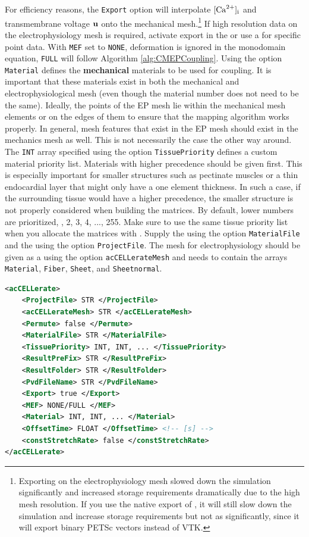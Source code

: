 For efficiency reasons, the \verb|Export| option will interpolate $[\mathrm{Ca}^{2+}]_{\mathrm{i}}$ and transmembrane voltage $\u$ onto the mechanical mesh.\footnote{Exporting on the electrophysiology mesh slowed down the simulation significantly and increased storage requirements dramatically due to the high mesh resolution. If you use the native export of \ACC, it will still slow down the simulation and increase storage requirements but not as significantly, since it will export binary PETSc vectors instead of VTK.}
If high resolution data on the electrophysiology mesh is required, activate export in the  or use a  for specific point data.
With \verb|MEF| set to \verb|NONE|, deformation is ignored in the monodomain equation, \verb|FULL| will follow Algorithm \autoref{alg:CMEPCoupling}.
Using the option \verb|Material| defines the \textbf{mechanical} materials to be used for coupling.
It is important that these materials exist in both the mechanical and electrophysiological mesh (even though the material number does not need to be the same).
Ideally, the points of the EP mesh lie within the mechanical mesh elements or on the edges of them to ensure that the mapping algorithm works properly.
In general, mesh features that exist in the EP mesh should exist in the mechanics mesh as well.
This is not necessarily the case the other way around.
The \verb|INT| array specified using the option \verb|TissuePriority| defines a custom material priority list.
Materials with higher precedence should be given first.
This is especially important for smaller structures such as pectinate muscles or a thin endocardial layer that might only have a one element thickness.
In such a case, if the surrounding tissue would have a higher precedence, the smaller structure is not properly considered when building the matrices.
By default, lower numbers are prioritized, , 2, 3, 4, ..., 255.
Make sure to use the same tissue priority list when you allocate the matrices with .
Supply the  using the option \verb|MaterialFile| and the  using the option \verb|ProjectFile|.
The mesh for electrophysiology should be given as a 
using the option \verb|acCELLerateMesh| and needs to contain the arrays \verb|Material|, \verb|Fiber|, \verb|Sheet|, and \verb|Sheetnormal|.

\begin{lstlisting}[language=XML,caption=.xml settings for the acCELLerate plugin]
<acCELLerate>
    <ProjectFile> STR </ProjectFile>
    <acCELLerateMesh> STR </acCELLerateMesh>
    <Permute> false </Permute>
    <MaterialFile> STR </MaterialFile>
    <TissuePriority> INT, INT, ... </TissuePriority>
    <ResultPreFix> STR </ResultPreFix>
    <ResultFolder> STR </ResultFolder>
    <PvdFileName> STR </PvdFileName>
    <Export> true </Export>
    <MEF> NONE/FULL </MEF>
    <Material> INT, INT, ... </Material>
    <OffsetTime> FLOAT </OffsetTime> <!-- [s] -->
    <constStretchRate> false </constStretchRate>
</acCELLerate>
\end{lstlisting}

